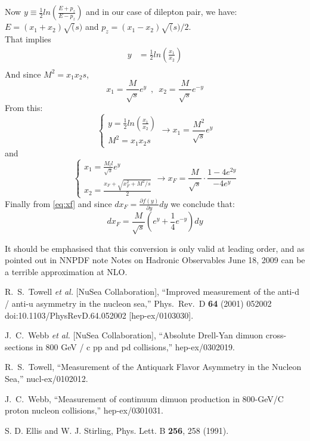 \documentclass[11pt]{article}
\newcommand{\be}{\begin{equation}}
\newcommand{\ee}{\end{equation}}
\begin{document}
\\\\Now $y \equiv \frac{1}{2} ln(\frac{E+p_z}{E-p_z})$ and in our case of dilepton pair, we have: $E =(x_1 + x_2)\sqrt(s)$ and $p_z = (x_1-x_2)\sqrt(s)/2$.
\\That implies 
\be
\begin{split}
    y & = \frac{1}{2}ln(\frac{x_1}{x_2})\\
\end{split}
\ee
And since $M^2 = x_1x_2s$, 
\be
x_1 = \frac{M}{\sqrt{s}}e^y \,\,\,,\,\,\,
x_2 = \frac{M}{\sqrt{s}}e^{-y}
\ee
From this:
\be
\begin{cases}
y = \frac{1}{2}ln(\frac{x_1}{x_2}) \\
M^2 = x_1x_2s
\end{cases}
\rightarrow x_1 = \frac{M^2}{\sqrt{s}}e^y
\ee
and 
\be \label{eq:xf}
\begin{cases}
x_1=\frac{M_ll}{\sqrt{s}}e^y \\
x_2=\frac{x_F + \sqrt{x_F^2 + M^2/s}}{2}
\end{cases}
\rightarrow x_F = \frac{M}{\sqrt{s}}\cdot\frac{1-4e^{2y}}{-4e^y}
\ee
Finally from \ref{eq:xf} and since $dx_F = \frac{\partial f(y)}{\partial y}dy$ we conclude that:
\be
dx_F = \frac{M}{\sqrt{s}}(e^y + \frac{1}{4}e^{-y})dy
\ee

It should be emphasised that this conversion is only valid at leading order, and as pointed out in NNPDF note Notes on Hadronic Observables June 18, 2009
can be a terrible approximation at NLO.

\begin{thebibliography}{9}
  
  R.~S.~Towell {\it et al.} [NuSea Collaboration],
  ``Improved measurement of the anti-d / anti-u asymmetry in the nucleon sea,''
  Phys.\ Rev.\ D {\bf 64} (2001) 052002
  doi:10.1103/PhysRevD.64.052002
  [hep-ex/0103030].

  J.~C.~Webb {\it et al.} [NuSea Collaboration],
  ``Absolute Drell-Yan dimuon cross-sections in 800 GeV / c pp and pd collisions,''
  hep-ex/0302019.

  R.~S.~Towell,
  ``Measurement of the Antiquark Flavor Asymmetry in the Nucleon Sea,''
  nucl-ex/0102012.

  J.~C.~Webb,
  ``Measurement of continuum dimuon production in 800-GeV/C proton nucleon collisions,''
  hep-ex/0301031.

  S. D. Ellis and W. J. Stirling,
  Phys. Lett. B\textbf{ 256}, 258 (1991).


\end{thebibliography}
\end{document}
